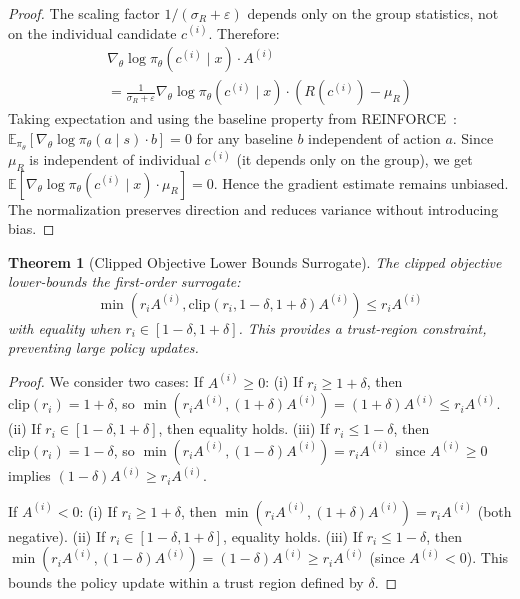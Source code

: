 \documentclass{article}
\theoremstyle{plain}
\newtheorem{theorem}{Theorem}[section]
\theoremstyle{definition}
\theoremstyle{remark}
\begin{document}
\begin{proof}
The scaling factor $1/(\sigma_R + \varepsilon)$ depends only on the group statistics, not on the individual candidate $c^{(i)}$. Therefore:
\begin{align}
\nabla_\theta \log \pi_\theta(c^{(i)} \mid x) \cdot A^{(i)} \nonumber \\
= \frac{1}{\sigma_R + \varepsilon} \nabla_\theta \log \pi_\theta(c^{(i)} \mid x) \cdot (R(c^{(i)}) - \mu_R)
\end{align}
Taking expectation and using the baseline property from REINFORCE~\citep{williams1992simple}: $\mathbb{E}_{\pi_\theta}[\nabla_\theta \log \pi_\theta(a \mid s) \cdot b] = 0$ for any baseline $b$ independent of action $a$. Since $\mu_R$ is independent of individual $c^{(i)}$ (it depends only on the group), we get $\mathbb{E}[\nabla_\theta \log \pi_\theta(c^{(i)} \mid x) \cdot \mu_R] = 0$. Hence the gradient estimate remains unbiased. The normalization preserves direction and reduces variance without introducing bias.
\end{proof}

\begin{theorem}[Clipped Objective Lower Bounds Surrogate]
\label{thm:clipped}
The clipped objective lower-bounds the first-order surrogate:
\begin{equation}
\min(r_i A^{(i)}, \text{clip}(r_i, 1-\delta, 1+\delta) A^{(i)}) \leq r_i A^{(i)}
\end{equation}
with equality when $r_i \in [1-\delta, 1+\delta]$. This provides a trust-region constraint, preventing large policy updates.
\end{theorem}

\begin{proof}
We consider two cases: If $A^{(i)} \geq 0$: (i) If $r_i \geq 1+\delta$, then $\text{clip}(r_i) = 1+\delta$, so $\min(r_i A^{(i)}, (1+\delta) A^{(i)}) = (1+\delta) A^{(i)} \leq r_i A^{(i)}$. (ii) If $r_i \in [1-\delta, 1+\delta]$, then equality holds. (iii) If $r_i \leq 1-\delta$, then $\text{clip}(r_i) = 1-\delta$, so $\min(r_i A^{(i)}, (1-\delta) A^{(i)}) = r_i A^{(i)}$ since $A^{(i)} \geq 0$ implies $(1-\delta) A^{(i)} \geq r_i A^{(i)}$.

If $A^{(i)} < 0$: (i) If $r_i \geq 1+\delta$, then $\min(r_i A^{(i)}, (1+\delta) A^{(i)}) = r_i A^{(i)}$ (both negative). (ii) If $r_i \in [1-\delta, 1+\delta]$, equality holds. (iii) If $r_i \leq 1-\delta$, then $\min(r_i A^{(i)}, (1-\delta) A^{(i)}) = (1-\delta) A^{(i)} \geq r_i A^{(i)}$ (since $A^{(i)} < 0$). This bounds the policy update within a trust region defined by $\delta$.
\end{proof}
\end{document}
